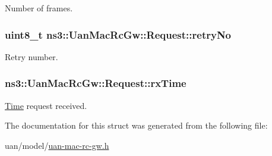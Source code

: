 Number of frames. 

\subsubsection[{\texorpdfstring{retry\+No}{retryNo}}]{\setlength{\rightskip}{0pt plus 5cm}uint8\+\_\+t ns3\+::\+Uan\+Mac\+Rc\+Gw\+::\+Request\+::retry\+No}\hypertarget{structns3_1_1UanMacRcGw_1_1Request_a1e555c7b772f40d377d7ea9966cf345b}{}\label{structns3_1_1UanMacRcGw_1_1Request_a1e555c7b772f40d377d7ea9966cf345b}


Retry number. 

\subsubsection[{\texorpdfstring{rx\+Time}{rxTime}}]{ ns3\+::\+Uan\+Mac\+Rc\+Gw\+::\+Request\+::rx\+Time}\hypertarget{structns3_1_1UanMacRcGw_1_1Request_ac537cd047223958f5dc11b18fdf97457}{}\label{structns3_1_1UanMacRcGw_1_1Request_ac537cd047223958f5dc11b18fdf97457}


\hyperlink{classns3_1_1Time}{Time} request received. 



The documentation for this struct was generated from the following file\+:\begin{DoxyCompactItemize}
\item 
uan/model/\hyperlink{uan-mac-rc-gw_8h}{uan-\/mac-\/rc-\/gw.\+h}\end{DoxyCompactItemize}
